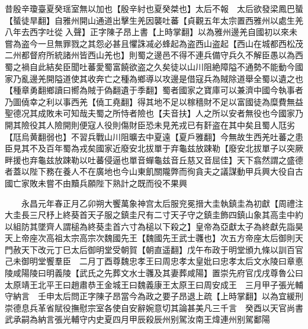 昔殷辛瓊臺夏癸瑶室無以加也【殷辛紂也夏癸桀也】太后不報　太后欲發梁鳳巴蜑【蜑徒旱翻】自雅州開山通道出擊生羌因襲吐蕃【貞觀五年太宗置西雅州以處生羌八年去西字吐從入聲】正字陳子昂上書【上時掌翻】以為雅州邊羌自國初以來未嘗為盗今一旦無罪戮之其怨必甚且懼誅㓕必蜂起為盗西山盗起【西山在城都西松茂二州都督府所統諸州皆西山羌也】則蜀之邊邑不得不連兵備守兵久不解臣愚以為西蜀之禍自此結矣臣聞吐蕃愛蜀富饒欲盗之久矣徒以山川阻絶障隘不通勢不能動今國家乃亂邊羌開隘道使其收奔亡之種為鄉導以攻邊是借寇兵為賊除道舉全蜀以遺之也【種章勇翻鄉讀曰嚮為賊于偽翻遺于季翻】蜀者國家之寶庫可以兼濟中國今執事者乃圖僥幸之利以事西羌【僥工堯翻】得其地不足以稼穡財不足以富國徒為糜費無益聖德况其成敗未可知哉夫蜀之所恃者險也【夫音扶】人之所以安者無役也今國家乃開其險役其人險開則便寇人役則傷財臣恐未見羌戎已有姧盗在其中矣且蜀人尫劣【尫烏黄翻弱也】不習兵戰山川阻曠去中夏遠【夏戶雅翻】今無故生西羌吐蕃之患臣見其不及百年蜀為戎矣國家近廢安北拔單于弃龜兹放踈勒【廢安北拔單子以突厥畔援也弃龜兹放踈勒以吐蕃侵逼也單音蟬龜兹音丘慈又音屈佳】天下翕然謂之盛德者蓋以陛下務在養人不在廣地也今山東飢關隴弊而徇貪夫之議謀動甲兵興大役自古國亡家敗未嘗不由黷兵願陛下熟計之既而役不果興

　　永昌元年春正月乙卯朔大饗萬象神宫太后服兖冕搢大圭執鎮圭為初獻【周禮注大圭長三尺杼上終葵首天子服之鎮圭尺有二寸天子守之鎮圭飾四鎮山象其高圭中約以組防其墜齊人謂槌為終葵圭首六寸為槌以下殺之】皇帝為亞獻太子為終獻先詣昊天上帝座次高祖太宗高宗次魏國先王【魏國先王武士彠也】次五方帝座太后御則天門赦天下改元丁巳太后御明堂受朝賀【朝直遥翻】戊午布政于明堂頒九條以訓百官己未御明堂饗羣臣　二月丁酉尊魏忠孝王曰周忠孝太皇妣曰忠孝太后文水陵曰章悳陵咸陽陵曰明義陵【武氏之先葬文水士彠及其妻葬咸陽】置崇先府官戊戌尊魯公曰太原靖王北平王曰趙肅恭王金城王曰魏義康王太原王曰周安成王　三月甲子張光輔守納言　壬申太后問正字陳子昂當今為政之要子昂退上疏【上時掌翻】以為宜緩刑崇德息兵革省賦役撫慰宗室各使自安辭婉意切其論甚美凡三千言　癸酉以天官尚書武承嗣為納言張光輔守内史夏四月甲辰殺辰州别駕汝南王煒連州别駕鄱陽

